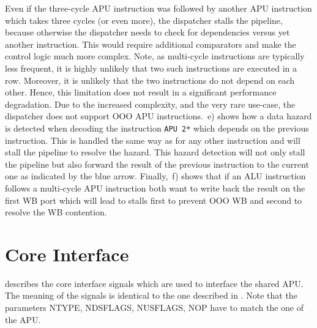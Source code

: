 \documentclass[%
 oneside,      %
 openany,      %
 halfparskip,  %
]{scrbook}
\begin{document}
Even if the three-cycle APU instruction was followed by another APU instruction which takes three cycles (or even more), the dispatcher stalls the pipeline, because otherwise the dispatcher needs to check for dependencies versus yet another instruction. This would require additional comparators and make the control logic much more complex.
Note, as multi-cycle instructions are typically less frequent, it is highly unlikely that two such instructions are executed in a row. Moreover, it is unlikely that the two instructions do not depend on each other. Hence, this limitation does not result in a significant performance degradation. Due to the increased complexity, and the very rare use-case, the dispatcher does not support OOO APU instructions.
\,e) shows how a data hazard is detected when decoding the instruction \texttt{APU 2*} which depends on the previous instruction. This is handled the same way as for any other instruction and will stall the pipeline to resolve the hazard. This hazard detection will not only stall the pipeline but also forward the result of the previous instruction to the current one as indicated by the blue arrow. Finally, \,f) shows that if an ALU instruction follows a multi-cycle APU instruction both want to write back the result on the first WB port which will lead to stalls first to prevent OOO WB and second to resolve the WB contention.

\section{Core Interface}\label{coreinterface}

 describes the core interface signals which are used to interface the shared APU. The meaning of the signals is identical to the one described in . Note that the parameters NTYPE, NDSFLAGS, NUSFLAGS, NOP have to match the one of the APU.
\end{document}
